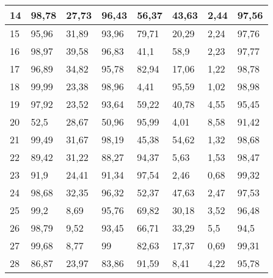 \begin{longtable}[c]{|l|l|l|l|l|l|l|l|}
14              & 98,78        & 27,73        & 96,43       & 56,37         & 43,63         & 2,44          & 97,56         \\ \hline
15              & 95,96        & 31,89        & 93,96       & 79,71         & 20,29         & 2,24          & 97,76         \\ \hline
16              & 98,97        & 39,58        & 96,83       & 41,1          & 58,9          & 2,23          & 97,77         \\ \hline
17              & 96,89        & 34,82        & 95,78       & 82,94         & 17,06         & 1,22          & 98,78         \\ \hline
18              & 99,99        & 23,38        & 98,96       & 4,41          & 95,59         & 1,02          & 98,98         \\ \hline
19              & 97,92        & 23,52        & 93,64       & 59,22         & 40,78         & 4,55          & 95,45         \\ \hline
20              & 52,5         & 28,67        & 50,96       & 95,99         & 4,01          & 8,58          & 91,42         \\ \hline
21              & 99,49        & 31,67        & 98,19       & 45,38         & 54,62         & 1,32          & 98,68         \\ \hline
22              & 89,42        & 31,22        & 88,27       & 94,37         & 5,63          & 1,53          & 98,47         \\ \hline
23              & 91,9         & 24,41        & 91,34       & 97,54         & 2,46          & 0,68          & 99,32         \\ \hline
24              & 98,68        & 32,35        & 96,32       & 52,37         & 47,63         & 2,47          & 97,53         \\ \hline
25              & 99,2         & 8,69         & 95,76       & 69,82         & 30,18         & 3,52          & 96,48         \\ \hline
26              & 98,79        & 9,52         & 93,45       & 66,71         & 33,29         & 5,5           & 94,5          \\ \hline
27              & 99,68        & 8,77         & 99          & 82,63         & 17,37         & 0,69          & 99,31         \\ \hline
28              & 86,87        & 23,97        & 83,86       & 91,59         & 8,41          & 4,22          & 95,78         \\ \hline

\end{longtable}
